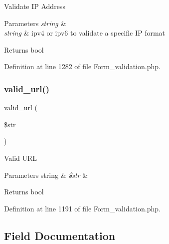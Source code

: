 Validate IP Address


\begin{DoxyParams}{Parameters}
{\em string} & \\
\hline
{\em string} & \textquotesingle{}ipv4\textquotesingle{} or \textquotesingle{}ipv6\textquotesingle{} to validate a specific IP format \\
\hline
\end{DoxyParams}
\begin{DoxyReturn}{Returns}
bool 
\end{DoxyReturn}


Definition at line 1282 of file Form\+\_\+validation.\+php.

\mbox{\label{class_c_i___form__validation_a2879cd05a763105684cbad690e5cffd3}} 
\subsubsection{\texorpdfstring{valid\_url()}{valid\_url()}}
{\footnotesize\ttfamily valid\+\_\+url (\begin{DoxyParamCaption}\item[{}]{\$str }\end{DoxyParamCaption})}

Valid U\+RL


\begin{DoxyParams}[1]{Parameters}
string & {\em \$str} & \\
\hline
\end{DoxyParams}
\begin{DoxyReturn}{Returns}
bool 
\end{DoxyReturn}


Definition at line 1191 of file Form\+\_\+validation.\+php.



\subsection{Field Documentation}
\mbox{\label{class_c_i___form__validation_aa1b63acebe8880c36ea51e11a57eb0d3}} 
